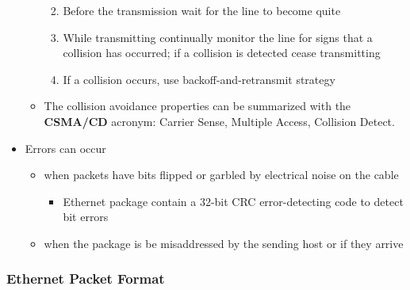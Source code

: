 \documentclass[11pt]{article}
\providecommand{\tightlist}{%
      \setlength{\itemsep}{0pt}\setlength{\parskip}{0pt}}
\begin{document}
\begin{itemize}
\begin{itemize}
    \begin{enumerate}
    \def\labelenumi{\arabic{enumi}.}
    \tightlist
    \item
      Before the transmission wait for the line to become quite
    \item
      While transmitting continually monitor the line for signs that a
      collision has occurred; if a collision is detected cease
      transmitting
    \item
      If a collision occurs, use backoff-and-retransmit strategy
    \end{enumerate}
  \item
    The collision avoidance properties can be summarized with the
    \textbf{CSMA/CD} acronym: Carrier Sense, Multiple Access, Collision
    Detect.
  \end{itemize}
\item
  Errors can occur

  \begin{itemize}
  \tightlist
  \item
    when packets have bits flipped or garbled by electrical noise on the
    cable

    \begin{itemize}
    \tightlist
    \item
      Ethernet package contain a 32-bit CRC error-detecting code to
      detect bit errors
    \end{itemize}
  \item
    when the package is be misaddressed by the sending host or if they
    arrive
  \end{itemize}
\end{itemize}

    \subsubsection{Ethernet Packet Format}\label{ethernet-packet-format}
\end{document}
